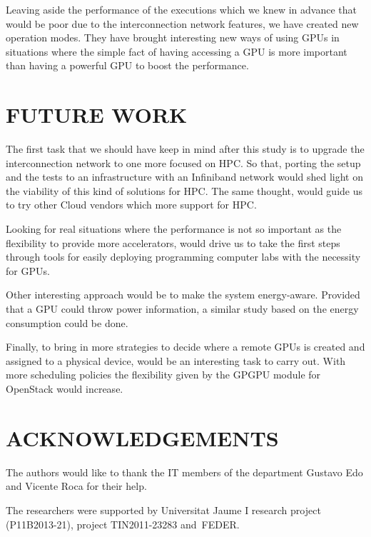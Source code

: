 \documentclass[a4paper,twoside]{article}
\begin{document}
Leaving aside the performance of the executions which we knew in advance that would be poor due to the interconnection network features, we have created new operation modes. They have brought interesting new ways of using GPUs in situations where the simple fact of having accessing a GPU is more important than having a powerful GPU to boost the performance.

\section{\uppercase{Future work}}
\label{sec:future}
The first task that we should have keep in mind after this study is to upgrade the interconnection network to one more focused on HPC.
So that, porting the setup and the tests to an infrastructure with an Infiniband network would shed light on the viability of this kind of solutions for HPC.
The same thought, would guide us to try other Cloud vendors which more support for HPC.

Looking for real situations where the performance is not so important as the flexibility to provide more accelerators, 
would drive us to take the first steps through tools for easily deploying programming computer labs with the necessity for GPUs.

Other interesting approach would be to make the system energy-aware. 
Provided that a GPU could throw power information, a similar study based on the energy consumption could be done.

Finally, to bring in more strategies to decide where a remote GPUs is created and assigned to a physical device, would be an interesting task to carry out. 
With more scheduling policies the flexibility given by the GPGPU module for OpenStack would increase.

\section*{\uppercase{Acknowledgements}}
The authors would like to thank the IT members of the department Gustavo Edo and Vicente Roca for their help.

The researchers were supported by Universitat Jaume I research project (P11B2013-21), project
TIN2011-23283 and~FEDER.


{\small
}
\end{document}
